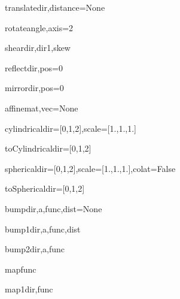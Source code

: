 \begin{methoddesc}{translate}{dir,distance=None}
\end{methoddesc}

\begin{methoddesc}{rotate}{angle,axis=2}
\end{methoddesc}

\begin{methoddesc}{shear}{dir,dir1,skew}
\end{methoddesc}

\begin{methoddesc}{reflect}{dir,pos=0}
\end{methoddesc}

\begin{methoddesc}{mirror}{dir,pos=0}
\end{methoddesc}

\begin{methoddesc}{affine}{mat,vec=None}
\end{methoddesc}


\begin{methoddesc}{cylindrical}{dir=[0,1,2],scale=[1.,1.,1.]}
\end{methoddesc}

\begin{methoddesc}{toCylindrical}{dir=[0,1,2]}
\end{methoddesc}

\begin{methoddesc}{spherical}{dir=[0,1,2],scale=[1.,1.,1.],colat=False}
\end{methoddesc}

\begin{methoddesc}{toSpherical}{dir=[0,1,2]}
\end{methoddesc}

\begin{methoddesc}{bump}{dir,a,func,dist=None}
\end{methoddesc}

\begin{methoddesc}{bump1}{dir,a,func,dist}
\end{methoddesc}

\begin{methoddesc}{bump2}{dir,a,func}
\end{methoddesc}

\begin{methoddesc}{map}{func}
\end{methoddesc}

\begin{methoddesc}{map1}{dir,func}
\end{methoddesc}

